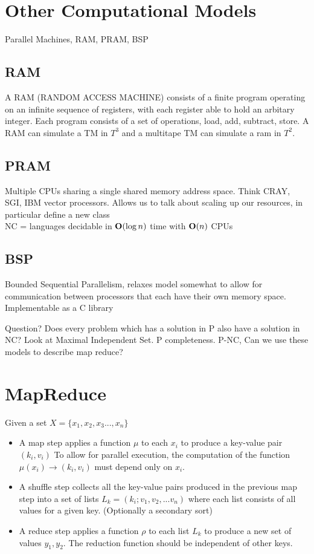 \documentclass[11pt,fleqn]{article}
\begin{document}
\section{Other Computational Models}
Parallel Machines, RAM, PRAM, BSP

\subsection{RAM}
 A RAM (RANDOM ACCESS MACHINE) consists of a finite program operating on an infinite sequence of registers, with each register able to hold an arbitary integer. Each program consists of a set of operations, load, add, subtract, store. A RAM can simulate a TM in $T^3$ and a multitape TM can simulate a ram in $T^2$.

\subsection{PRAM}
Multiple CPUs sharing a single shared memory address space. Think CRAY, SGI, IBM vector processors. Allows us to talk about scaling up our resources, in particular define a new class 
\\
NC = languages decidable in $\mbox{{\bfseries O}} (\log n)$ time with $\mbox{{\bfseries O}}(n)$ CPUs

\subsection{BSP} 
Bounded Sequential Parallelism, relaxes model somewhat to allow for communication between processors that each have their own memory space. Implementable as a C library

Question? 
Does every problem which has a solution in P also have a solution in NC? Look at Maximal Independent Set. P completeness. P-NC, Can we use these models to describe map reduce?

\section{MapReduce} 
Given a set $X=\{ x_1,x_2, x_3 ..., x_n \}$
\begin{itemize}
\item
A map step applies a function $\mu$ to each $x_i$ to produce a key-value pair $(k_i, v_i)$ To allow for parallel execution, the computation of the function $\mu(x_i)\rightarrow (k_i,v_i) $ must depend only on $x_i$. 

\item
A shuffle step collects all the key-value pairs produced in the previous map step into a set of lists $L_k = (k_i;v_1, v_2,...v_n)$ where each list consists of all values for a given key. (Optionally a secondary sort)

\item 
A reduce step applies a function $\rho$ to each list $L_k$  to produce a new set of values $y_1, y_2$. The reduction function should be independent of other keys. 
\end{itemize}
\end{document}
